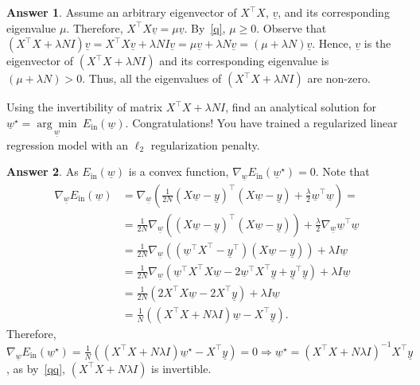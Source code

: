 \documentclass{article}
\theoremstyle{definition}
\newtheorem*{answer}{Answer}
\begin{document}
\begin{question}[start=0]
\begin{question}
			\begin{answer}
				Assume an arbitrary eigenvector of $X^\top X$, $\underline{v}$, and its corresponding eigenvalue $\mu$. Therefore, $X^\top X \underline{v} = \mu \underline{v}$. By~\ref{q}, $\mu \geq 0$. Observe that $(X^\top X + \lambda N  I) \underline{v} = X^\top X \underline{v} + \lambda N  I \underline{v} = \mu \underline{v} + \lambda N \underline{v} = (\mu + \lambda N) \underline{v}$. Hence, $\underline{v}$ is the eigenvector of $(X^\top X + \lambda N  I)$ and its corresponding eigenvalue is $(\mu + \lambda N) > 0$. Thus, all the eigenvalues of $(X^\top X + \lambda N  I)$ are non-zero.
			\end{answer}
			\item Using the invertibility of matrix $X^\top X + \lambda N  I$, find an analytical solution for $\underline{w}^\star = \underset{\underline{w}}{\arg \min}~E_{\text{in}}(\underline{w})$. Congratulations! You have trained a regularized linear regression model with an $\ell_2$ regularization penalty.
			\begin{answer}
				As $E_{\text{in}}(\underline{w})$ is a convex function, $\nabla_{\!\underline{w}}E_{\text{in}}(\underline{w}^\star) = 0$. Note that 
				\begin{align*}
					\nabla_{\!\underline{w}}E_{\text{in}}(\underline{w})  &= \nabla_{\!\underline{w}}(\frac{1}{2N} (X \underline{w} - \underline{y})^\top (X \underline{w} - \underline{y}) + \frac{\lambda}{2} \underline{w}^\top \underline{w}) =\\
					&= \frac{1}{2N} \nabla_{\!\underline{w}}\left((X \underline{w} - \underline{y})^\top (X \underline{w} - \underline{y})\right)+\frac{\lambda}{2} \nabla_{\!\underline{w}} \underline{w}^\top \underline{w}\\
					&= \frac{1}{2N} \nabla_{\!\underline{w}}\left((\underline{w}^\top X^\top  - \underline{y}^\top) (X \underline{w} - \underline{y})\right)+\lambda I \underline{w}\\
					&= \frac{1}{2N} \nabla_{\!\underline{w}}\left(\underline{w}^\top X^\top X \underline{w} - 2\underline{w}^\top X^\top \underline{y}  + \underline{y}^\top \underline{y}\right)+\lambda I \underline{w}\\
					&= \frac{1}{2N} \left(2 X^\top X \underline{w} - 2 X^\top \underline{y}\right)+\lambda I \underline{w}\\
					&= \frac{1}{N} \left((X^\top X + N \lambda I) \underline{w} - X^\top \underline{y}\right).
				\end{align*}
				Therefore, $\nabla_{\!\underline{w}}E_{\text{in}}(\underline{w}^\star) = \frac{1}{N} \left((X^\top X + N \lambda I) \underline{w}^\star - X^\top \underline{y}\right) = 0 \Rightarrow \underline{w}^\star = (X^\top X + N \lambda I)^{-1} X^\top \underline{y}$, as by~\ref{qq}, $(X^\top X + N \lambda I)$ is invertible.

\end{answer}
\end{question}
\end{question}
\end{document}
